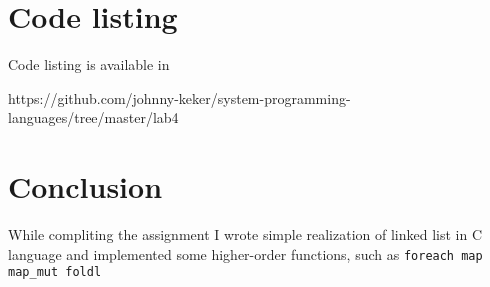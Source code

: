 \documentclass[12pt, a4paper]{article}
\begin{document}
\section*{Code listing}
Code listing is available in

https://github.com/johnny-keker/system-programming-languages/tree/master/lab4

\section*{Conclusion}
While compliting the assignment I wrote simple realization of linked list in C language and implemented some higher-order functions, such as
\texttt{foreach map map\_mut foldl}
\end{document}
